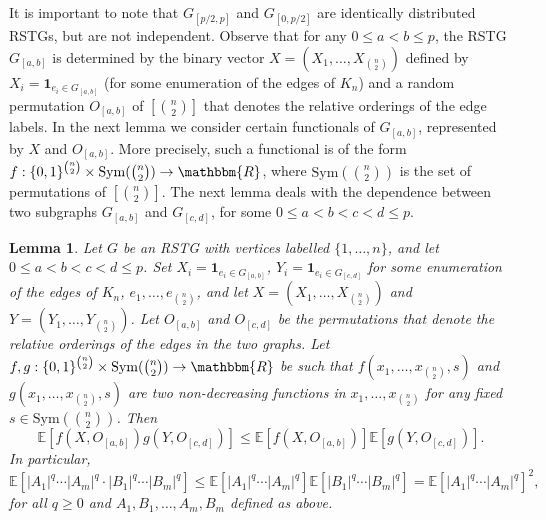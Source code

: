 \documentclass[11pt]{article}
\newtheorem{lemma}[theorem]{Lemma}
\newcommand{\1}{\mathbf{1}} %
\newcommand{\ex}{\mathbb{E}} %
\newcommand{\R}{\mathbbm{R}} %
\begin{document}
It is important to note that $G_{[p/2,p]}$ and $G_{[0,p/2]}$ are identically distributed RSTGs, but are not independent. Observe that for any $0\le a < b \le p$, the RSTG $G_{[a,b]}$ is determined by the binary vector $X = (X_1,\ldots,X_{\binom{n}{2}})$
defined by $X_i = \1_{e_i \in G_{[a,b]}}$ (for some enumeration of the edges of $K_n$) and a random permutation $O_{[a,b]}$ of
$[\binom{n}{2}]$ that denotes the relative orderings of the edge labels. In the next lemma we consider certain functionals
of $G_{[a,b]}$, represented by $X$ and $O_{[a,b]}$. More precisely, such a functional is of the form
$f:\{0,1\}^{\binom{n}{2}}\times \mathrm{Sym}(\binom{n}{2}) \to \R$, where $\mathrm{Sym}(\binom{n}{2})$ is the set of permutations
of $[\binom{n}{2}]$.
The next lemma deals with the dependence between two subgraphs $G_{[a,b]}$ and $G_{[c,d]}$, for some $0 \leq a < b < c < d \leq p$.


\setcounter{theorem}{5}

\begin{lemma}\label{dependence}
Let $G$ be an RSTG with vertices labelled $\{1,\ldots,n\}$, and let $0 \leq a < b < c < d \leq p$. Set $X_i = \1_{e_i \in G_{[a,b]}}$, $Y_i = \1_{e_i \in G_{[c,d]}}$ for some enumeration of the edges of $K_n$, $e_1,\ldots,e_{\binom{n}{2}}$, and let $X = (X_1,\ldots,X_{\binom{n}{2}})$ and $Y = (Y_1,\ldots,Y_{\binom{n}{2}})$. Let $O_{[a,b]}$ and $O_{[c,d]}$ be the permutations that denote the relative orderings of the edges in the two graphs. 
Let
$f,g:\{0,1\}^{\binom{n}{2}}\times \mathrm{Sym}(\binom{n}{2}) \to \R$ be such that
 $f(x_1,\ldots,x_{\binom{n}{2}},s)$ and $g(x_1,\ldots,x_{\binom{n}{2}},s)$ are two non-decreasing functions in $x_1,\ldots,x_{\binom{n}{2}}$ for any fixed $s\in  \mathrm{Sym}(\binom{n}{2})$. 
Then
$$\ex\left[f\left(X,O_{[a,b]}\right)g\left(Y,O_{[c,d]}\right)\right] \leq \ex\left[f\left(X,O_{[a,b]}\right)\right] \ex\left[g\left(Y,O_{[c,d]}\right)\right].$$
In particular,
$$\ex\left[ |A_1|^q \cdots |A_m|^q \cdot |B_1|^q \cdots |B_m|^q \right] \leq \ex\left[|A_1|^q \cdots |A_m|^q \right]\ex\left[
|B_1|^q \cdots |B_m|^q\right] = \ex\left[|A_1|^q \cdots |A_m|^q\right]^2,$$
for all $q \geq 0$ and $A_1,B_1,\ldots,A_m,B_m$ defined as above.
\end{lemma}
\end{document}
